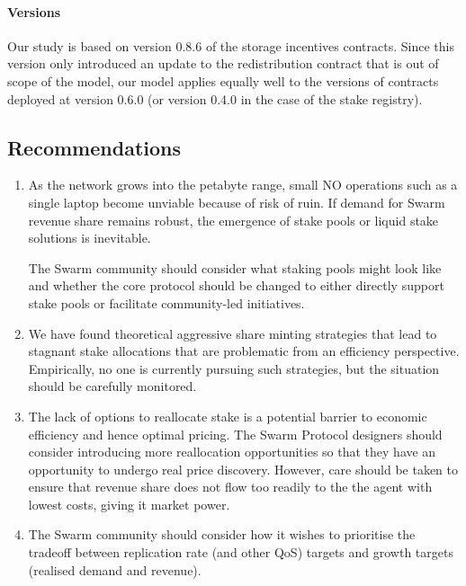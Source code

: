\paragraph{Versions}
Our study is based on version 0.8.6 of the storage incentives contracts.
%
Since this version only introduced an update to the redistribution contract that is out of scope of the model, our model applies equally well to the versions of contracts deployed at version 0.6.0 (or version 0.4.0 in the case of the stake registry).


\subsection{Recommendations}

\begin{enumerate}
  \item
    As the network grows into the petabyte range, small NO operations such as a single laptop become unviable because of risk of ruin.
    If demand for Swarm revenue share remains robust, the emergence of stake pools or liquid stake solutions is inevitable.

    The Swarm community should consider what staking pools might look like and whether the core protocol should be changed to either directly support stake pools or facilitate community-led initiatives.

  \item
    We have found theoretical aggressive share minting strategies that lead to stagnant stake allocations that are problematic from an efficiency perspective.
    Empirically, no one is currently pursuing such strategies, but the situation should be carefully monitored.

  \item
    The lack of options to reallocate stake is a potential barrier to economic efficiency and hence optimal pricing.
    The Swarm Protocol designers should consider introducing more reallocation opportunities so that they have an opportunity to undergo real price discovery.
    However, care should be taken to ensure that revenue share does not flow too readily to the the agent with lowest costs, giving it market power.

  \item
    The Swarm community should consider how it wishes to prioritise the tradeoff between replication rate (and other QoS) targets and growth targets (realised demand and revenue).

\end{enumerate}



